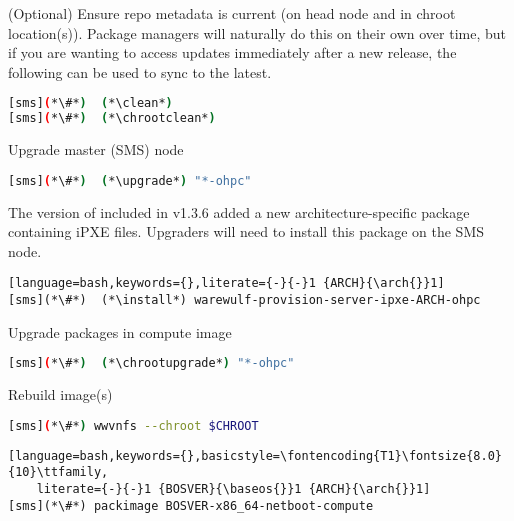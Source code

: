 \begin{enumerate*}
\item (Optional) Ensure repo metadata is current (on head node and in chroot
  location(s)). Package managers will naturally do this on their own over time,
  but if you are wanting to access updates immediately after a new release,
  the following can be used to sync to the latest.

\begin{lstlisting}[language=bash,keywords={}]
[sms](*\#*)  (*\clean*)
[sms](*\#*)  (*\chrootclean*)
\end{lstlisting}

\item Upgrade master (SMS) node

\begin{lstlisting}[language=bash,keywords={}]
[sms](*\#*)  (*\upgrade*) "*-ohpc"
\end{lstlisting}
  
\begin{center}
\begin{tcolorbox}[]
\small
The version of \Warewulf{} included in \OHPC{} v1.3.6 added a new
architecture-specific package containing iPXE files. Upgraders will need to
install this package on the SMS node.
\begin{lstlisting}[language=bash,keywords={},literate={-}{-}1 {ARCH}{\arch{}}1]
[sms](*\#*)  (*\install*) warewulf-provision-server-ipxe-ARCH-ohpc
\end{lstlisting}
\end{tcolorbox}
\end{center}
\fi

\item Upgrade packages in compute image

\begin{lstlisting}[language=bash,keywords={}]
[sms](*\#*)  (*\chrootupgrade*) "*-ohpc"
\end{lstlisting}
  
\item Rebuild image(s)

\begin{lstlisting}[language=bash,keywords={}]
[sms](*\#*) wwvnfs --chroot $CHROOT
\end{lstlisting}
\fi

\begin{lstlisting}[language=bash,keywords={},basicstyle=\fontencoding{T1}\fontsize{8.0}{10}\ttfamily,
    literate={-}{-}1 {BOSVER}{\baseos{}}1 {ARCH}{\arch{}}1]
[sms](*\#*) packimage BOSVER-x86_64-netboot-compute
\end{lstlisting}
\fi

\end{enumerate*}

